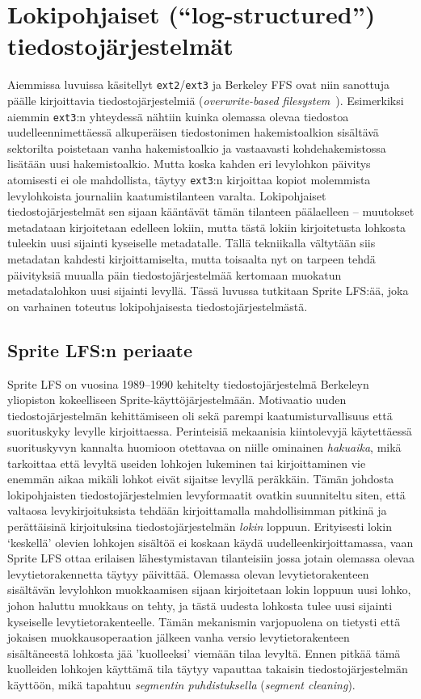 \section{Lokipohjaiset (``log-structured'') tiedostojärjestelmät}
\label{ChapLogStructured}
Aiemmissa luvuissa käsitellyt \texttt{ext2}/\texttt{ext3} ja Berkeley FFS ovat niin sanottuja päälle kirjoittavia tiedostojärjestelmiä (\emph{overwrite-based filesystem}~\cite{Btrfs}).
Esimerkiksi aiemmin \texttt{ext3}:n yhteydessä nähtiin kuinka olemassa olevaa tiedostoa uudelleennimettäessä
alkuperäisen tiedostonimen hakemistoalkion sisältävä sektorilta poistetaan vanha hakemistoalkio
ja vastaavasti kohdehakemistossa lisätään uusi hakemistoalkio.
Mutta koska kahden eri levylohkon päivitys atomisesti ei ole mahdollista,
täytyy \texttt{ext3}:n kirjoittaa kopiot molemmista levylohkoista journaliin kaatumistilanteen varalta.
Lokipohjaiset tiedostojärjestelmät sen sijaan kääntävät tämän tilanteen päälaelleen -- muutokset metadataan kirjoitetaan edelleen lokiin,
mutta tästä lokiin kirjoitetusta lohkosta tuleekin uusi sijainti kyseiselle metadatalle.
Tällä tekniikalla vältytään siis metadatan kahdesti kirjoittamiselta,
mutta toisaalta nyt on tarpeen tehdä päivityksiä muualla päin tiedostojärjestelmää kertomaan muokatun metadatalohkon uusi sijainti levyllä.
Tässä luvussa tutkitaan Sprite LFS:ää, joka on varhainen toteutus lokipohjaisesta tiedostojärjestelmästä.

\subsection{Sprite LFS:n periaate}
Sprite LFS on vuosina 1989--1990 kehitelty tiedostojärjestelmä Berkeleyn yliopiston kokeelliseen Sprite-käyttöjärjestelmään.
Motivaatio uuden tiedostojärjestelmän kehittämiseen oli sekä parempi kaatumisturvallisuus että suorituskyky levylle kirjoittaessa.
Perinteisiä mekaanisia kiintolevyjä käytettäessä suorituskyvyn kannalta huomioon otettavaa on niille ominainen \emph{hakuaika},
mikä tarkoittaa että levyltä useiden lohkojen lukeminen tai kirjoittaminen vie enemmän aikaa mikäli lohkot eivät sijaitse levyllä peräkkäin.
Tämän johdosta lokipohjaisten tiedostojärjestelmien levyformaatit ovatkin suunniteltu siten,
että valtaosa levykirjoituksista tehdään kirjoittamalla mahdollisimman pitkinä ja perättäisinä kirjoituksina tiedostojärjestelmän \emph{lokin} loppuun.
Erityisesti lokin `keskellä' olevien lohkojen sisältöä ei koskaan käydä uudelleenkirjoittamassa,
vaan Sprite LFS ottaa erilaisen lähestymistavan tilanteisiin jossa jotain olemassa olevaa levytietorakennetta täytyy päivittää.
Olemassa olevan levytietorakenteen sisältävän levylohkon muokkaamisen sijaan kirjoitetaan lokin loppuun uusi lohko,
johon haluttu muokkaus on tehty,
ja tästä uudesta lohkosta tulee uusi sijainti kyseiselle levytietorakenteelle.
Tämän mekanismin varjopuolena on tietysti että jokaisen muokkausoperaation jälkeen vanha versio levytietorakenteen sisältäneestä lohkosta jää 'kuolleeksi' viemään tilaa levyltä.
Ennen pitkää tämä kuolleiden lohkojen käyttämä tila täytyy vapauttaa takaisin tiedostojärjestelmän käyttöön,
mikä tapahtuu \emph{segmentin puhdistuksella} (\emph{segment cleaning}).

